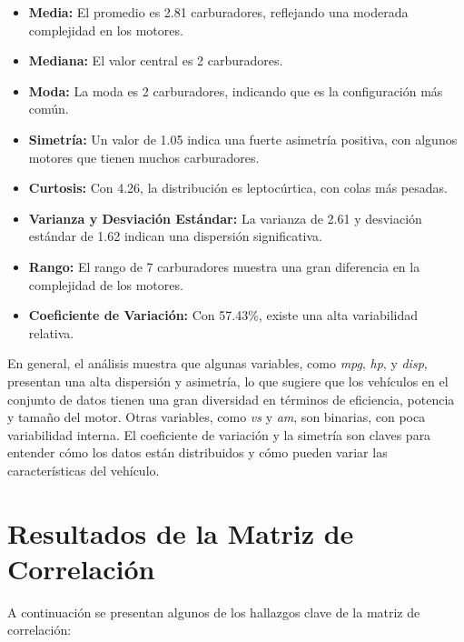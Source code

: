 \documentclass{article}
\begin{document}
\begin{enumerate}
	      \begin{itemize}
		      \item \textbf{Media:} El promedio es 2.81 carburadores, reflejando una moderada complejidad en los motores.
		      \item \textbf{Mediana:} El valor central es 2 carburadores.
		      \item \textbf{Moda:} La moda es 2 carburadores, indicando que es la configuración más común.
		      \item \textbf{Simetría:} Un valor de 1.05 indica una fuerte asimetría positiva, con algunos motores que tienen muchos carburadores.
		      \item \textbf{Curtosis:} Con 4.26, la distribución es leptocúrtica, con colas más pesadas.
		      \item \textbf{Varianza y Desviación Estándar:} La varianza de 2.61 y desviación estándar de 1.62 indican una dispersión significativa.
		      \item \textbf{Rango:} El rango de 7 carburadores muestra una gran diferencia en la complejidad de los motores.
		      \item \textbf{Coeficiente de Variación:} Con 57.43\%, existe una alta variabilidad relativa.
	      \end{itemize}
\end{enumerate}
En general, el análisis muestra que algunas variables, como \textit{mpg}, \textit{hp}, y \textit{disp}, presentan una alta dispersión y asimetría, lo que sugiere que los vehículos en el conjunto de datos tienen una gran diversidad en términos de eficiencia, potencia y tamaño del motor. Otras variables, como \textit{vs} y \textit{am}, son binarias, con poca variabilidad interna. El coeficiente de variación y la simetría son claves para entender cómo los datos están distribuidos y cómo pueden variar las características del vehículo.


\section{Resultados de la Matriz de Correlación}
A continuación se presentan algunos de los hallazgos clave de la matriz de correlación:
\end{document}
